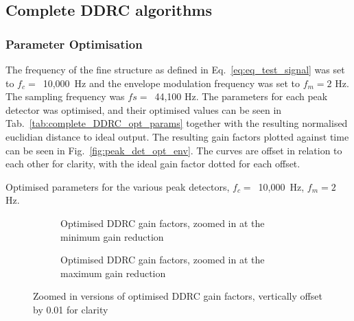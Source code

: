 \documentclass[../main2.tex]{subfiles}
\providecommand{\rootdir}{..}
\begin{document}
\subsection{Complete DDRC algorithms}

\subsubsection{Parameter Optimisation}
The frequency of the fine structure as defined in Eq.~\eqref{eq:eq_test_signal} was set to $f_c = $~10,000~Hz and the envelope modulation frequency was set to $f_m = 2$ Hz. The sampling frequency was $fs = $~44,100 Hz. The parameters for each peak detector was optimised, and their optimised values can be seen in Tab.~\ref{tab:complete_DDRC_opt_params} together with the resulting normalised euclidian distance to ideal output. The resulting gain factors plotted against time can be seen in Fig.~\ref{fig:peak_det_opt_env}. The curves are offset in relation to each other for clarity, with the ideal gain factor dotted for each offset. 

\begin{table}[h]
\small
\begin{center}
\caption{Optimised parameters for the various peak detectors, $f_c=$~10,000~Hz, $f_m=2$ Hz.}
\label{tab:complete_DDRC_opt_params}

\end{center}
\end{table}

\begin{figure}
\captionsetup{justification=centering}
\begin{subfigure}{\linewidth}
\centering
\centerline{}
\caption{Optimised DDRC gain factors, zoomed in at the minimum gain reduction}
\end{subfigure}

\par\bigskip

\captionsetup{justification=centering}
\begin{subfigure}{\linewidth}
\centering
\centerline{}
\caption{Optimised DDRC gain factors, zoomed in at the maximum gain reduction}
\end{subfigure}

\caption{Zoomed in versions of optimised DDRC gain factors, vertically offset by 0.01 for clarity}
\label{fig:peak_det_opt_env_zoom}
\end{figure}
\end{document}
